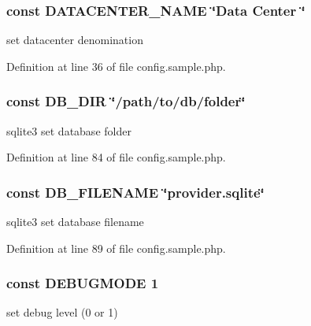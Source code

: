 \subsubsection[{\texorpdfstring{D\+A\+T\+A\+C\+E\+N\+T\+E\+R\+\_\+\+N\+A\+ME}{DATACENTER_NAME}}]{\setlength{\rightskip}{0pt plus 5cm}const D\+A\+T\+A\+C\+E\+N\+T\+E\+R\+\_\+\+N\+A\+ME \char`\"{}Data Center \char`\"{}}\hypertarget{namespace_bms_a28e24c389e469e22acd9d33abfe3fb4d}{}\label{namespace_bms_a28e24c389e469e22acd9d33abfe3fb4d}
set datacenter denomination 

Definition at line 36 of file config.\+sample.\+php.

\subsubsection[{\texorpdfstring{D\+B\+\_\+\+D\+IR}{DB_DIR}}]{\setlength{\rightskip}{0pt plus 5cm}const D\+B\+\_\+\+D\+IR \char`\"{}/path/to/db/folder\char`\"{}}\hypertarget{namespace_bms_a525a6614ba9af7ba1f60bb7e60572a0c}{}\label{namespace_bms_a525a6614ba9af7ba1f60bb7e60572a0c}
sqlite3 set database folder 

Definition at line 84 of file config.\+sample.\+php.

\subsubsection[{\texorpdfstring{D\+B\+\_\+\+F\+I\+L\+E\+N\+A\+ME}{DB_FILENAME}}]{\setlength{\rightskip}{0pt plus 5cm}const D\+B\+\_\+\+F\+I\+L\+E\+N\+A\+ME \char`\"{}provider.\+sqlite\char`\"{}}\hypertarget{namespace_bms_abc05b2c0a077204fb0ef0f345a8f006f}{}\label{namespace_bms_abc05b2c0a077204fb0ef0f345a8f006f}
sqlite3 set database filename 

Definition at line 89 of file config.\+sample.\+php.

\subsubsection[{\texorpdfstring{D\+E\+B\+U\+G\+M\+O\+DE}{DEBUGMODE}}]{\setlength{\rightskip}{0pt plus 5cm}const D\+E\+B\+U\+G\+M\+O\+DE 1}\hypertarget{namespace_bms_a7af7ef3e15183adae80bfc7cf0272937}{}\label{namespace_bms_a7af7ef3e15183adae80bfc7cf0272937}
set debug level (0 or 1) 

